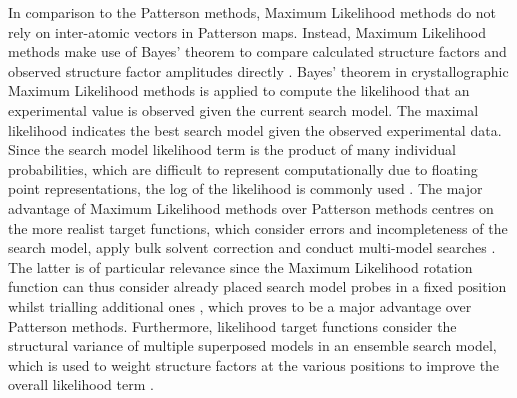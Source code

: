 In comparison to the Patterson methods, Maximum Likelihood methods do not rely on inter-atomic vectors in Patterson maps. Instead, Maximum Likelihood methods make use of Bayes' theorem \cite{Bayes1763-ox} to compare calculated structure factors and observed structure factor amplitudes directly \cite{Read2001-nu}. Bayes' theorem in crystallographic Maximum Likelihood methods is applied to compute the likelihood that an experimental value is observed given the current search model. The maximal likelihood indicates the best search model given the observed experimental data. Since the search model likelihood term is the product of many individual probabilities, which are difficult to represent computationally due to floating point representations, the log of the likelihood is commonly used \cite{Rupp2010-nc}. The major advantage of Maximum Likelihood methods over Patterson methods centres on the more realist target functions, which consider errors and incompleteness of the search model, apply bulk solvent correction and conduct multi-model searches \cite{Read2001-nu}. The latter is of particular relevance since the Maximum Likelihood rotation function can thus consider already placed search model probes in a fixed position whilst trialling additional ones \cite{Storoni2004-ed}, which proves to be a major advantage over Patterson methods.  Furthermore, likelihood target functions consider the structural variance of multiple superposed models in an ensemble search model, which is used to weight structure factors at the various positions to improve the overall likelihood term \cite{Read2001-nu}. 

